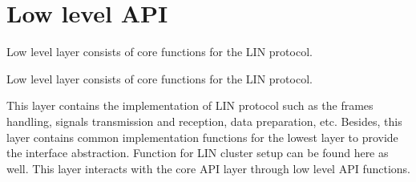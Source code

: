 \hypertarget{group__lowlevel__group}{}\section{Low level A\+P\+I}
\label{group__lowlevel__group}


Low level layer consists of core functions for the L\+I\+N protocol.  


Low level layer consists of core functions for the L\+I\+N protocol. 

This layer contains the implementation of L\+I\+N protocol such as the frames handling, signals transmission and reception, data preparation, etc. Besides, this layer contains common implementation functions for the lowest layer to provide the interface abstraction. Function for L\+I\+N cluster setup can be found here as well. This layer interacts with the core A\+P\+I layer through low level A\+P\+I functions. 